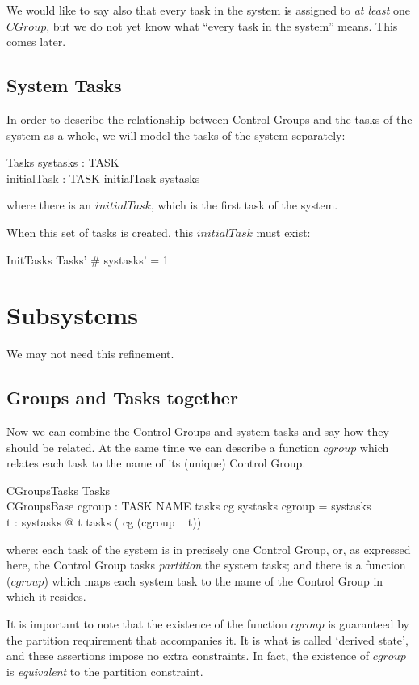 \documentclass[a4paper,twoside,12pt]{article}
\begin{document}
We would like to say also that every task in the system is assigned to \emph{at least} one $CGroup$, but we do not yet know what ``every task in the system'' means. This comes later.

\subsection{System Tasks}
In order to describe the relationship between Control Groups and the tasks of the system as a whole, we will model the tasks of the system separately:

\begin{schema}{Tasks}
systasks : \finset TASK \\
initialTask : TASK
\where
initialTask \in systasks
\end{schema}
where there is an $initialTask$, which is the first task of the system.

When this set of tasks is created, this $initialTask$ must exist:

\begin{schema}{InitTasks}
Tasks'
\where
\# systasks' = 1
\end{schema}
\section{Subsystems}
We may not need this refinement.

\subsection{Groups and Tasks together}
Now we can combine the Control Groups and system tasks and say how they should be related. At the same time we can describe a function $cgroup$ which relates each task to the name of its (unique) Control Group.

\begin{schema}{CGroupsTasks}
Tasks \\
CGroupsBase
\also
cgroup : TASK \ffun NAME
\where
tasks \circ cg \partition systasks
\also
\dom cgroup = systasks \\
\forall t : systasks @ t \in tasks ( cg (cgroup ~ t))
\end{schema}
where: each task of the system is in precisely one Control Group, or, as expressed here, the Control Group tasks \emph{partition} the system tasks; and there is a function ($cgroup$) which maps each system task to the name of the Control Group in which it resides.

It is important to note that the existence of the function $cgroup$ is guaranteed by the partition requirement that accompanies it. It is what is called `derived state', and these assertions impose no extra constraints. In fact, the existence of $cgroup$ is \emph{equivalent} to the partition constraint.
\end{document}
